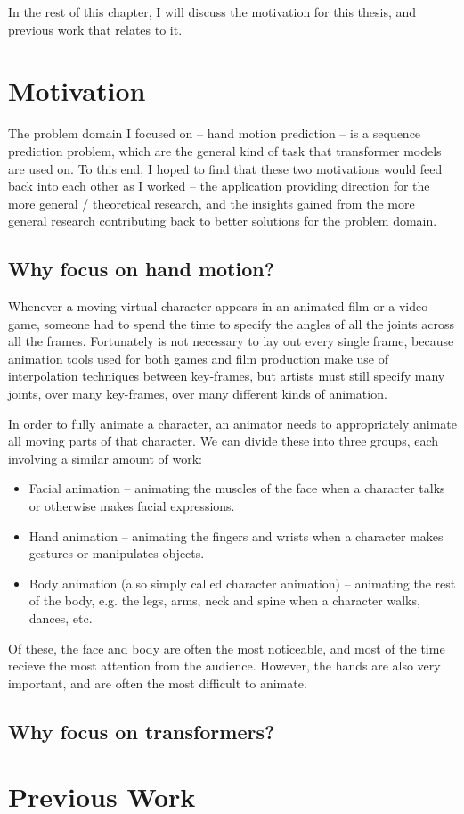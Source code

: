 In the rest of this chapter, I will discuss the motivation for this thesis, and previous work that relates to it.

\section{Motivation}
\label{s:motivation}
The problem domain I focused on -- hand motion prediction -- is a sequence prediction problem, which are  the general kind of task that transformer models are used on. To this end, I hoped to find that these two motivations would feed back into each other as I worked -- the application providing direction for the more general / theoretical research, and the insights gained from the more general research contributing back to better solutions for the problem domain.

\subsection{Why focus on hand motion?}
\label{ss:why-hand-motion}

Whenever a moving virtual character appears in an animated film or a video game, someone had to spend the time to specify the angles of all the joints across all the frames. Fortunately is not necessary to lay out every single frame, because animation tools used for both games and film production make use of interpolation techniques between key-frames, but artists must still specify many joints, over many key-frames, over many different kinds of animation.

In order to fully animate a character, an animator needs to appropriately animate all moving parts of that character. We can divide these into three groups, each involving a similar amount of work:
\begin{itemize}
    \item Facial animation -- animating the muscles of the face when a character talks or otherwise makes facial expressions.
    \item Hand animation -- animating the fingers and wrists when a character makes gestures or manipulates objects.
    \item Body animation (also simply called character animation) -- animating the rest of the body, e.g. the legs, arms, neck and spine when a character walks, dances, etc.
\end{itemize}

Of these, the face and body are often the most noticeable, and most of the time recieve the most attention from the audience. However, the hands are also very important, and are often the most difficult to animate.


\subsection{Why focus on transformers?}
\label{ss:why-transformers}


\section{Previous Work}
